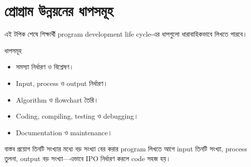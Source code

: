 \section{প্রোগ্রাম উন্নয়নের ধাপসমূহ}

\begin{learningbox}
এই টপিক শেষে শিক্ষার্থী program development life cycle-এর ধাপগুলো ধারাবাহিকভাবে লিখতে পারবে।
\end{learningbox}

\begin{center}
\end{center}

\begin{keypointbox}{ধাপসমূহ}
\begin{itemize}
\item সমস্যা নির্ধারণ ও বিশ্লেষণ।
\item Input, process ও output নির্ধারণ।
\item Algorithm ও flowchart তৈরি।
\item Coding, compiling, testing ও debugging।
\item Documentation ও maintenance।
\end{itemize}
\end{keypointbox}

\begin{examplebox}{বাস্তব প্রয়োগ}
তিনটি সংখ্যার মধ্যে বড় সংখ্যা বের করার program লিখতে আগে input তিনটি সংখ্যা, process তুলনা, output বড় সংখ্যা—এভাবে IPO নির্ধারণ করলে code সহজ হয়।
\end{examplebox}
